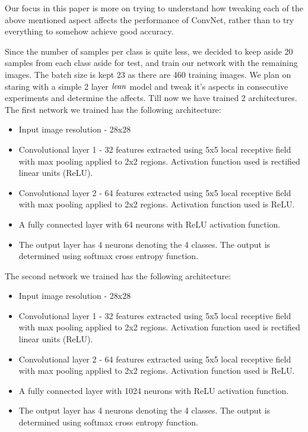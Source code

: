 \documentclass{article} %
\begin{document}
Our focus in this paper is more on trying to understand how tweaking each of the above mentioned aspect affects the performance of ConvNet, rather than to try everything to somehow achieve good accuracy.
\par Since the number of samples per class is quite less, we decided to keep aside 20 samples from each class aside for test, and train our network with the remaining images. The batch size is kept 23 as there are 460 training images. We plan on staring with a simple 2 layer $\it{lean}$ model and tweak it's aspects in consecutive experiments and determine the affects. Till now we have trained 2 architectures.
The first network we trained has the following architecture:
\begin{itemize}
		\item 
		Input image resolution - 28x28
		\item
		Convolutional layer 1 - 32 features extracted using 5x5 local receptive field with max pooling applied to 2x2 regions. Activation function used is rectified linear units (ReLU).
		\item
		Convolutional layer 2 - 64 features extracted using 5x5 local receptive field with max pooling applied to 2x2 regions. Activation function used is ReLU.
		\item
		A fully connected layer with 64 neurons with ReLU activation function.
		\item
		The output layer has 4 neurons denoting the 4 classes. The output is determined using softmax cross entropy function.
				
\end{itemize}

The second network we trained has the following architecture:
\begin{itemize}
		\item 
		Input image resolution - 28x28
		\item
		Convolutional layer 1 - 32 features extracted using 5x5 local receptive field with max pooling applied to 2x2 regions. Activation function used is rectified linear units (ReLU).
		\item
		Convolutional layer 2 - 64 features extracted using 5x5 local receptive field with max pooling applied to 2x2 regions. Activation function used is ReLU.
		\item
		A fully connected layer with 1024 neurons with ReLU activation function.
		\item
		The output layer has 4 neurons denoting the 4 classes. The output is determined using softmax cross entropy function.
				
\end{itemize}
\end{document}
